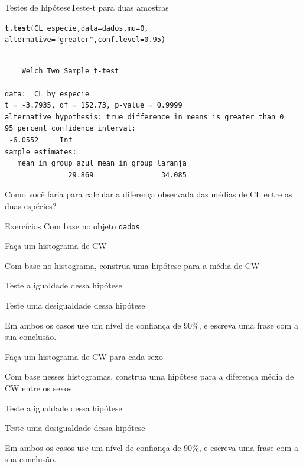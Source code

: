 \documentclass[10pt]{beamer}\usepackage[]{graphicx}\usepackage[]{color}
\makeatletter
\newcommand{\hlnum}[1]{\textcolor[rgb]{0.686,0.059,0.569}{#1}}%
\newcommand{\hlstr}[1]{\textcolor[rgb]{0.192,0.494,0.8}{#1}}%
\newcommand{\hlopt}[1]{\textcolor[rgb]{0,0,0}{#1}}%
\newcommand{\hlstd}[1]{\textcolor[rgb]{0.345,0.345,0.345}{#1}}%
\newcommand{\hlkwc}[1]{\textcolor[rgb]{0.333,0.667,0.333}{#1}}%
\newcommand{\hlkwd}[1]{\textcolor[rgb]{0.737,0.353,0.396}{\textbf{#1}}}%
\newenvironment{kframe}{%
 \def\at@end@of@kframe{}%
 \ifinner\ifhmode%
  \def\at@end@of@kframe{\end{minipage}}%
  \begin{minipage}{\columnwidth}%
 \fi\fi%
 \def\FrameCommand##1{\hskip\@totalleftmargin \hskip-\fboxsep
 \colorbox{shadecolor}{##1}\hskip-\fboxsep
     \hskip-\linewidth \hskip-\@totalleftmargin \hskip\columnwidth}%
 \MakeFramed {\advance\hsize-\width
   \@totalleftmargin\z@ \linewidth\hsize
   \@setminipage}}%
 {\par\unskip\endMakeFramed%
 \at@end@of@kframe}
\newenvironment{knitrout}{}{} %
\theoremstyle{definition}
\makeatother
\begin{document}
\begin{frame}[fragile=singleslide]{Testes de hipótese}{Teste-t para duas amostras}
\begin{knitrout}\small
{}\color{fgcolor}\begin{kframe}
\begin{alltt}
\hlkwd{t.test}\hlstd{(CL} \hlopt{~} \hlstd{especie,} \hlkwc{data} \hlstd{= dados,} \hlkwc{mu} \hlstd{=} \hlnum{0}\hlstd{,}
       \hlkwc{alternative} \hlstd{=} \hlstr{"greater"}\hlstd{,} \hlkwc{conf.level} \hlstd{=} \hlnum{0.95}\hlstd{)}
\end{alltt}
\begin{verbatim}

	Welch Two Sample t-test

data:  CL by especie
t = -3.7935, df = 152.73, p-value = 0.9999
alternative hypothesis: true difference in means is greater than 0
95 percent confidence interval:
 -6.0552     Inf
sample estimates:
   mean in group azul mean in group laranja 
               29.869                34.085 
\end{verbatim}
\end{kframe}
\end{knitrout}
Como você faria para calcular a diferença observada das médias de CL
entre as duas espécies?
\end{frame}

\begin{frame}[fragile=singleslide]{Exercícios}
Com base no objeto \texttt{dados}:
  \begin{compactenum}[(1)]
  \item Faça um histograma de CW
  \item Com base no histograma, construa uma hipótese para a média de CW
    \begin{compactenum}[(a)]
    \item Teste a igualdade dessa hipótese
    \item Teste uma desigualdade dessa hipótese
    \end{compactenum}
    Em ambos os casos use um nível de confiança de 90\%, e escreva uma
    frase com a sua conclusão.
  \item Faça um histograma de CW para cada sexo
  \item Com base nesses histogramas, construa uma hipótese para a
    diferença média de CW entre os sexos
    \begin{compactenum}[(a)]
    \item Teste a igualdade dessa hipótese
    \item Teste uma desigualdade dessa hipótese
    \end{compactenum}
    Em ambos os casos use um nível de confiança de 90\%, e escreva uma
    frase com a sua conclusão.
  \end{compactenum}
\end{frame}
\end{document}
